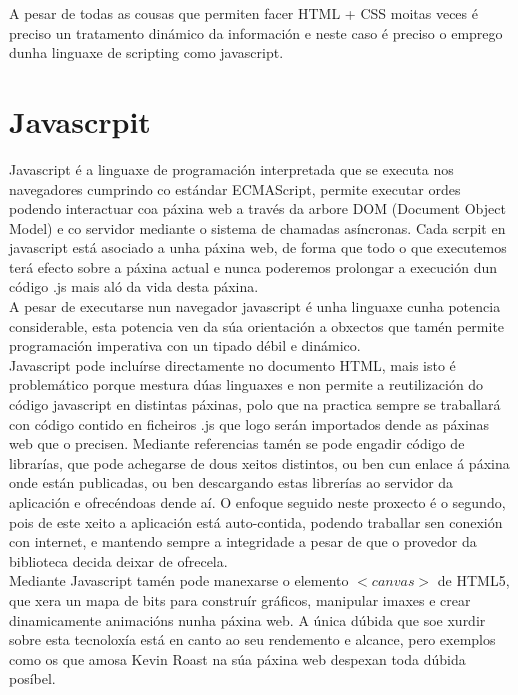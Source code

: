             A pesar de todas as cousas que permiten facer HTML + CSS moitas veces é preciso un 
            tratamento dinámico da información e neste caso é preciso o emprego dunha linguaxe de 
            scripting como javascript.
    
    \section{Javascrpit}
        Javascript é a linguaxe de programación interpretada que se executa nos navegadores
        cumprindo co estándar ECMAScript, permite executar ordes podendo interactuar coa páxina 
        web a través da arbore DOM (Document Object Model) e co servidor mediante o sistema de
        chamadas asíncronas. Cada scrpit en javascript está asociado a unha páxina web, de forma
        que todo o que executemos terá efecto sobre a páxina actual e nunca poderemos prolongar
        a execución dun código .js mais aló da vida desta páxina.\\
        
        A pesar de executarse nun navegador javascript é unha linguaxe cunha potencia 
        considerable, esta potencia ven da súa orientación a obxectos que tamén permite 
        programación imperativa con un tipado débil e dinámico.\\
        
        Javascript pode incluírse directamente no documento HTML, mais isto é problemático 
        porque mestura dúas linguaxes e non permite a reutilización do código javascript en
        distintas páxinas, polo que na practica sempre se traballará con código contido en
        ficheiros .js que logo serán importados dende as páxinas web que o precisen. Mediante 
        referencias tamén se pode engadir código de librarías, que pode achegarse de dous xeitos
        distintos, ou ben cun enlace á páxina onde están publicadas, ou ben descargando estas
        librerías ao servidor da aplicación e ofrecéndoas dende aí. O enfoque seguido neste 
        proxecto é o segundo, pois de este xeito a aplicación está auto-contida, podendo traballar
        sen conexión con internet, e mantendo sempre a integridade a pesar de que o provedor
        da biblioteca decida deixar de ofrecela.\\
        
        Mediante Javascript tamén pode manexarse o elemento $<canvas>$ de HTML5, que xera un mapa
        de bits para construír gráficos, manipular imaxes e crear dinamicamente animacións nunha
        páxina web. A única dúbida que soe xurdir sobre esta tecnoloxía está en canto ao seu 
        rendemento e alcance, pero exemplos como os que amosa Kevin Roast na súa páxina 
        web\cite{kevin-roast-canvas-examples} despexan toda dúbida posíbel.\\
        
